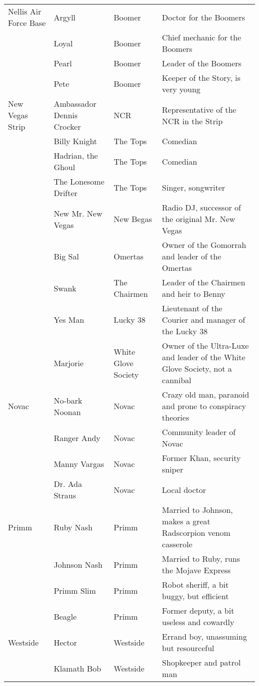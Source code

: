 \begin{longtable}{|p{3cm}|p{3cm}|p{3cm}|p{6cm}|}
Nellis Air Force Base & Argyll & Boomer & Doctor for the Boomers \\
\hfill & Loyal & Boomer & Chief mechanic for the Boomers \\
\hfill & Pearl & Boomer & Leader of the Boomers \\
\hfill & Pete & Boomer & Keeper of the Story, is very young \\
New Vegas Strip & Ambassador Dennis Crocker & NCR & Representative of the NCR in the Strip \\
\hfill & Billy Knight & The Tops & Comedian \\
\hfill & Hadrian, the Ghoul & The Tops & Comedian \\
\hfill & The Lonesome Drifter & The Tops & Singer, songwriter \\
\hfill & New Mr. New Vegas & New Begas & Radio DJ, successor of the original Mr. New Vegas \\
\hfill & Big Sal & Omertas & Owner of the Gomorrah and leader of the Omertas \\
\hfill & Swank & The Chairmen & Leader of the Chairmen and heir to Benny \\
\hfill & Yes Man & Lucky 38 & Lieutenant of the Courier and manager of the Lucky 38 \\
\hfill & Marjorie & White Glove Society & Owner of the Ultra-Luxe and leader of the White Glove Society, not a cannibal \\
Novac & No-bark Noonan & Novac & Crazy old man, paranoid and prone to conspiracy theories \\
\hfill & Ranger Andy & Novac & Community leader of Novac \\
\hfill & Manny Vargas & Novac & Former Khan, security sniper \\
\hfill & Dr. Ada Straus & Novac & Local doctor \\
Primm & Ruby Nash & Primm & Married to Johnson, makes a great Radscorpion venom casserole \\
\hfill & Johnson Nash & Primm & Married to Ruby, runs the Mojave Express  \\
\hfill & Primm Slim & Primm & Robot sheriff, a bit buggy, but efficient \\
\hfill & Beagle & Primm & Former deputy, a bit useless and cowardly \\
Westside & Hector & Westside & Errand boy, unassuming but resourceful \\
\hfill & Klamath Bob & Westside & Shopkeeper and patrol man \\

\end{longtable}
